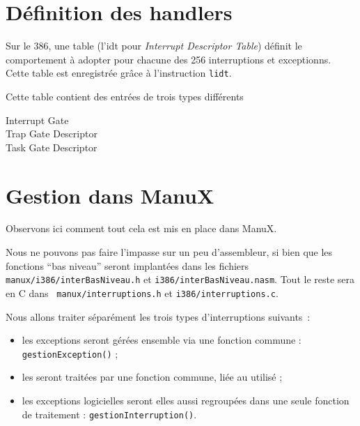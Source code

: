    
%      
\section{Définition des handlers}

   Sur le 386, une table (l'{\sc idt} pour {\em Interrupt Descriptor Table})
définit le comportement à adopter pour chacune des 256 interruptions
et exceptionns. Cette table est enregistrée grâce à l'instruction
\lstinline!lidt!.

   Cette table contient des entrées de trois types différents

\begin{description}
   \item[Interrupt Gate]       
   \item[Trap Gate Descriptor]       
   \item[Task Gate Descriptor]       
\end{description}

%      
\section{Gestion dans ManuX}

   Observons ici comment tout cela est mis en place dans ManuX.

   Nous ne pouvons pas faire l'impasse sur un peu d'assembleur, si
bien que les fonctions ``bas niveau'' seront implantées dans les
fichiers {\tt manux/i386/interBasNiveau.h} et
\lstinline!i386/interBasNiveau.nasm!. Tout le reste sera en C dans {\tt
  manux/interruptions.h} et {\tt i386/interruptions.c}.

   Nous allons traiter séparément les trois types d'interruptions
suivants~:

\begin{itemize}
   \item les exceptions seront gérées ensemble via une fonction
     commune : \lstinline!gestionException()! ;
   \item les \irq seront traitées par une fonction commune, liée au \pic
     utilisé ;
   \item les exceptions logicielles seront elles aussi regroupées dans
     une seule fonction de traitement :
     \lstinline!gestionInterruption()!. 
\end{itemize}

